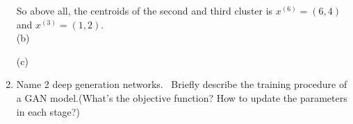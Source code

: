 \documentclass[10pt]{article}
\begin{document}
\begin{enumerate}[1.]
So above all, the centroids of the second and third cluster is $x^{(6)}=(6,4)$ and $x^{(3)}=(1,2)$.\\
 
(b)



(c)



		 
		 
		 
		\newpage


	\item {} Name 2 deep generation networks.~ Briefly describe the training procedure of a GAN model.(What's the objective function? How to update the parameters in each stage?)~\\

	
	



\end{enumerate}
\end{document}
